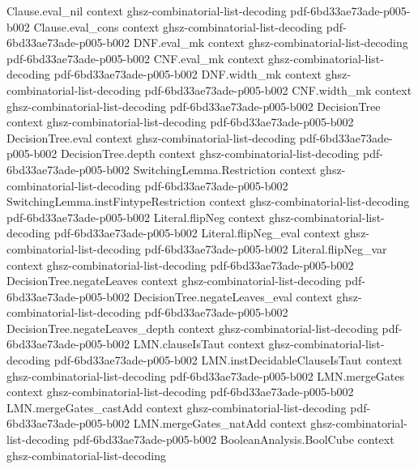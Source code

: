 \begin{lemma}
  {Clause.eval_nil}
  {context}
  {ghsz-combinatorial-list-decoding}
  {pdf-6bd33ae73ade-p005-b002}
\proofstep
  {Clause.eval_cons}
  {context}
  {ghsz-combinatorial-list-decoding}
  {pdf-6bd33ae73ade-p005-b002}
\proofstep
  {DNF.eval_mk}
  {context}
  {ghsz-combinatorial-list-decoding}
  {pdf-6bd33ae73ade-p005-b002}
\proofstep
  {CNF.eval_mk}
  {context}
  {ghsz-combinatorial-list-decoding}
  {pdf-6bd33ae73ade-p005-b002}
\proofstep
  {DNF.width_mk}
  {context}
  {ghsz-combinatorial-list-decoding}
  {pdf-6bd33ae73ade-p005-b002}
\proofstep
  {CNF.width_mk}
  {context}
  {ghsz-combinatorial-list-decoding}
  {pdf-6bd33ae73ade-p005-b002}
\proofstep
  {DecisionTree}
  {context}
  {ghsz-combinatorial-list-decoding}
  {pdf-6bd33ae73ade-p005-b002}
\proofstep
  {DecisionTree.eval}
  {context}
  {ghsz-combinatorial-list-decoding}
  {pdf-6bd33ae73ade-p005-b002}
\proofstep
  {DecisionTree.depth}
  {context}
  {ghsz-combinatorial-list-decoding}
  {pdf-6bd33ae73ade-p005-b002}
\proofstep
  {SwitchingLemma.Restriction}
  {context}
  {ghsz-combinatorial-list-decoding}
  {pdf-6bd33ae73ade-p005-b002}
\proofstep
  {SwitchingLemma.instFintypeRestriction}
  {context}
  {ghsz-combinatorial-list-decoding}
  {pdf-6bd33ae73ade-p005-b002}
\proofstep
  {Literal.flipNeg}
  {context}
  {ghsz-combinatorial-list-decoding}
  {pdf-6bd33ae73ade-p005-b002}
\proofstep
  {Literal.flipNeg_eval}
  {context}
  {ghsz-combinatorial-list-decoding}
  {pdf-6bd33ae73ade-p005-b002}
\proofstep
  {Literal.flipNeg_var}
  {context}
  {ghsz-combinatorial-list-decoding}
  {pdf-6bd33ae73ade-p005-b002}
\proofstep
  {DecisionTree.negateLeaves}
  {context}
  {ghsz-combinatorial-list-decoding}
  {pdf-6bd33ae73ade-p005-b002}
\proofstep
  {DecisionTree.negateLeaves_eval}
  {context}
  {ghsz-combinatorial-list-decoding}
  {pdf-6bd33ae73ade-p005-b002}
\proofstep
  {DecisionTree.negateLeaves_depth}
  {context}
  {ghsz-combinatorial-list-decoding}
  {pdf-6bd33ae73ade-p005-b002}
\proofstep
  {LMN.clauseIsTaut}
  {context}
  {ghsz-combinatorial-list-decoding}
  {pdf-6bd33ae73ade-p005-b002}
\proofstep
  {LMN.instDecidableClauseIsTaut}
  {context}
  {ghsz-combinatorial-list-decoding}
  {pdf-6bd33ae73ade-p005-b002}
\proofstep
  {LMN.mergeGates}
  {context}
  {ghsz-combinatorial-list-decoding}
  {pdf-6bd33ae73ade-p005-b002}
\proofstep
  {LMN.mergeGates_castAdd}
  {context}
  {ghsz-combinatorial-list-decoding}
  {pdf-6bd33ae73ade-p005-b002}
\proofstep
  {LMN.mergeGates_natAdd}
  {context}
  {ghsz-combinatorial-list-decoding}
  {pdf-6bd33ae73ade-p005-b002}
\proofstep
  {BooleanAnalysis.BoolCube}
  {context}
  {ghsz-combinatorial-list-decoding}

\end{lemma}
